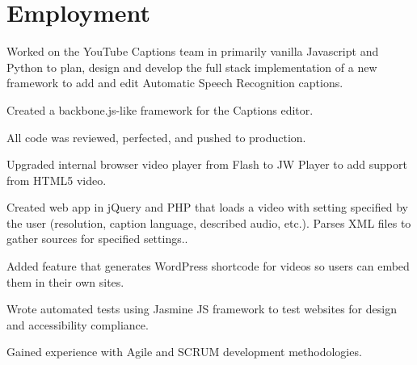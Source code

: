 \documentclass[]{deedy-resume-openfont}
\begin{document}
\begin{minipage}[t]{0.66\textwidth} 


\section{Employment}

\vspace{\topsep} %
\begin{tightemize}
\item Worked on the YouTube Captions team in primarily vanilla Javascript and Python to plan, design and develop the full stack implementation of a new framework to add and edit Automatic Speech Recognition captions.
\item Created a backbone.js-like framework for the Captions editor.
\item All code was reviewed, perfected, and pushed to production.
\end{tightemize}
\sectionsep

\begin{tightemize}
\item Upgraded internal browser video player from Flash to JW Player to add support from HTML5 video.
\item Created web app in jQuery and PHP that loads a video with setting specified by the user (resolution, caption language, described audio, etc.). Parses XML files to gather sources for specified settings..
\item Added feature that generates WordPress shortcode for videos so users can embed them in their own sites.
\item Wrote automated tests using Jasmine JS framework to test websites for design and accessibility compliance.
\item Gained experience with Agile and SCRUM development methodologies.
\end{tightemize}
\sectionsep



\end{minipage}
\end{document}
